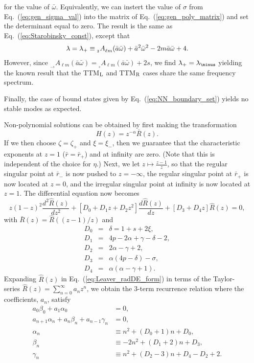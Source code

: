 \documentclass[11pt]{article}
\makeatletter
\newcommand{\scA}[4][]{{}_{{}_{#2}}A^{#1}_{#3}(#4)}
\def\lambdabar{\protect\@lambdabar}
\def\@lambdabar{%
\relax
\bgroup
\def\@tempa{\hbox{\raise.73\ht0
\hbox to0pt{\kern.25\wd0\vrule width.5\wd0
height.1pt depth.1pt\hss}\box0}}%
\mathchoice{\setbox0\hbox{$\displaystyle\lambda$}\@tempa}%
{\setbox0\hbox{$\textstyle\lambda$}\@tempa}%
{\setbox0\hbox{$\scriptstyle\lambda$}\@tempa}%
{\setbox0\hbox{$\scriptscriptstyle\lambda$}\@tempa}%
\egroup
}
\makeatother
\begin{document}
for the value of $\bar\omega$.  Equivalently, we can instert the value
of $\sigma$ from Eq.~(\ref{eq:gen_sigma_val}) into the matrix of
Eq.~(\ref{eq:gen_poly_matrix}) and set the determinant equal to zero.
The result is the same as Eq.~(\ref{eq:Starobinsky_const}), except
that
\begin{equation}
  \lambdabar=\lambdabar_+\equiv \scA{2}{\ell{m}}{\bar{a}\bar\omega}
     + \bar{a}^2\bar\omega^2 - 2m\bar{a}\bar\omega+4.
\end{equation}
However, since
$\scA{-s}{\ell{m}}{\bar{a}\bar\omega}=\scA{s}{\ell{m}}{\bar{a}\bar\omega}+2s$,
we find $\lambdabar_+=\lambdabar_\minus$ yielding the known result
that the TTM${}_{\rm L}$ and TTM${}_{\rm R}$ cases share the same
frequency spectrum.

Finally, the case of bound states given by Eq.~(\ref{eq:NN_boundary_set})
yields no stable modes as expected.



\vspace{0.25in}
Non-polynomial solutions can be obtained by first making the transformation
\begin{equation}
  H(z) = z^{-\alpha}\bar{R}(z).
\end{equation}
If we then choose $\zeta=\zeta_+$ and $\xi=\xi_\minus$, then we
guarantee that the characteristic exponents at $z=1$
($\bar{r}=\bar{r}_+$) and at infinity are zero.  (Note that this is
independent of the choice for $\eta$.)  Next, we let
$z\mapsto\frac{z-1}{z}$, so that the regular singular point at
$\bar{r}_\minus$ is now pushed to $z=-\infty$, the regular singular
point at $\bar{r}_+$ is now located at $z=0$, and the irregular
singular point at infinity is now located at $z=1$.  The differential
equation now becomes
\begin{equation}\label{eq:Leaver_radDE_form}
  z(1-z)^2\frac{d^2\hat{R}(z)}{dz^2} 
     + \left[D_0 + D_1z + D_2z^2\right]\frac{d\hat{R}(z)}{dz} 
     + \left[D_3 + D_4z\right]\hat{R}(z) = 0,
\end{equation}
with $\bar{R}(z)=\hat{R}((z-1)/z)$ and
\begin{eqnarray}
  D_0 &=& \delta = 1+s+2\xi, \\
  D_1 &=& 4p-2\alpha+\gamma-\delta-2, \\
  D_2 &=& 2\alpha-\gamma+2, \\
  D_3 &=& \alpha(4p-\delta)-\sigma, \\
  D_4 &=& \alpha(\alpha-\gamma+1).
\end{eqnarray}
Expanding $\hat{R}(z)$ in Eq.~(\ref{eq:Leaver_radDE_form}) in terms of
the Taylor-series $\hat{R}(z)=\sum_{n=0}^\infty{a_nz^n}$, we obtain
the 3-term recurrence relation where the coefficients, $a_n$, satisfy
\begin{align}\label{eq:Leaver_rad_2-term}
  a_0\beta_0 + a_1\alpha_0 &= 0, \\ \label{eq:Leaver_rad_3-term}
  a_{n+1}\alpha_n + a_n\beta_n + a_{n-1}\gamma_n &=0, \\
  \alpha_n &\equiv n^2 + (D_0+1)n + D_0, \\
  \beta_n &\equiv -2n^2 + (D_1+2)n + D_3, \\
  \gamma_n &\equiv n^2 + (D_2-3)n +D_4 - D_2 +2.
\end{align}
\end{document}
